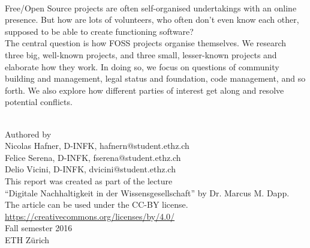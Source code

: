 \thispagestyle{empty}
\begin{center}
  {\bfseries\Huge\doctitle} \\
  \vspace{4cm}
  \parbox{0.7\linewidth}{\small
    Free/Open Source projects are often self-organised undertakings with an online presence. But how are lots of volunteers, who often don't even know each other, supposed to be able to create functioning software? \\
    
    The central question is how FOSS projects organise themselves. We research three big, well-known projects, and three small, lesser-known projects and elaborate how they work. In doing so, we focus on questions of community building and management, legal status and foundation, code management, and so forth. We also explore how different parties of interest get along and resolve potential conflicts.} \\
  \vspace{7cm}
  Authored by \\
  Nicolas Hafner, D-INFK, hafnern@student.ethz.ch \\
  Felice Serena, D-INFK,  fserena@student.ethz.ch \\
  Delio Vicini, D-INFK, dvicini@student.ethz.ch \\
  \vspace{1cm}
  This report was created as part of the lecture \\
  ``Digitale Nachhaltigkeit in der Wissensgesellschaft'' by Dr. Marcus M. Dapp. \\
  \vspace{1cm}
  The article can be used under the CC-BY license. \\
  \url{https://creativecommons.org/licenses/by/4.0/} \\
  \vspace{2cm}
  Fall semester 2016 \\
  ETH Zürich
\end{center}

\newpage


